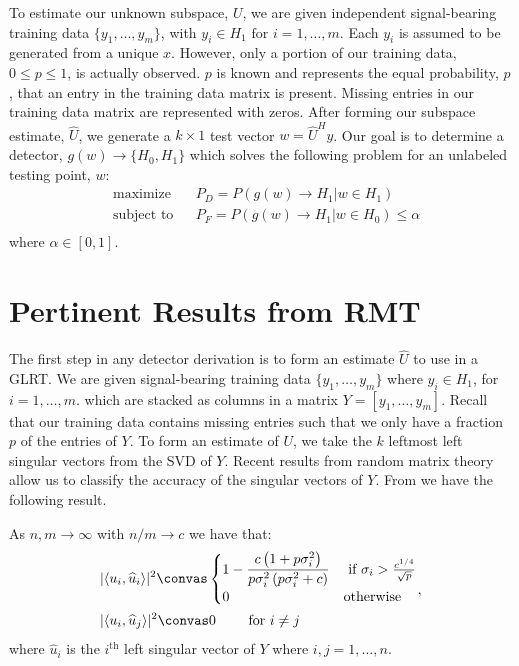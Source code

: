 To estimate our unknown subspace, $U$, we are given independent signal-bearing training data $\{y_1,\dots,y_m\}$, with $y_i\in H_1 \text{ for } i=1,\dots,m$. Each $y_i$ is assumed to be generated from a unique $x$. However, only a portion of our training data, $0\leq p\leq 1$, is actually observed. $p$ is known and represents the equal probability, $p$, that an entry in the training data matrix is present. Missing entries in our training data matrix are represented with zeros. After forming our subspace estimate, $\widehat{U}$,  we generate a $k \times 1$ test vector $w=\widehat{U}^Hy$. Our goal is to determine a detector, $g(w)\to\{H_0,H_1\}$ which solves the following problem for an unlabeled testing point, $w$:
\begin{equation}\label{eq:maximization}
\begin{aligned}
&\text{maximize}
&& P_D=P\left(g(w)\to H_1 | w\in H_1\right)\\
&\text{subject to}
&& P_F=P\left(g(w)\to H_1 | w\in H_0\right)\leq\alpha\\
\end{aligned}
\end{equation}
where $\alpha\in[0,1]$.

\section{Pertinent Results from RMT}\label{sec:rmt}

The first step in any detector derivation is to form an estimate $\widehat{U}$ to use in a GLRT. We are given signal-bearing training data $\{y_1,\dots,y_m\}$ where $y_i\in H_1$, for $i=1,\dots,m$. which are stacked as columns in a matrix $Y=[y_1,\dots,y_m]$. Recall that our training data contains missing entries such that we only have a fraction $p$ of the entries of $Y$. To form an estimate of $U$, we take the $k$ leftmost left singular vectors from the SVD of $Y$. Recent results from random matrix theory allow us to classify the accuracy of the singular vectors of $Y$. From \cite{benaych2011singular} we have the following result.

\begin{Th}\label{th:angles}
As $n,m \longrightarrow \infty$ with $n/m \to c$ we have that:
\begin{equation*}
\begin{aligned}
&|\langle u_i,\widehat{u}_i\rangle|^2\convas
\begin{cases}
1-\dfrac{c\left(1+p\sigma_i^2\right)}{p\sigma_i^2\left(p\sigma_i^2 + c\right)} & \text{ if } \sigma_{i}>\frac{c^{1/4}}{\sqrt{p}}\\
0 & \textrm{otherwise}\\
\end{cases}\\
&|\langle u_i,\widehat{u}_j\rangle|^2\convas 0 \qquad \textrm{ for } i \neq j\\
\end{aligned},
\end{equation*}
where $\widehat{u}_i$ is the $i^{\text{th}}$ left singular vector of $Y$ where $i,j=1,\dots,n$.
\end{Th}

